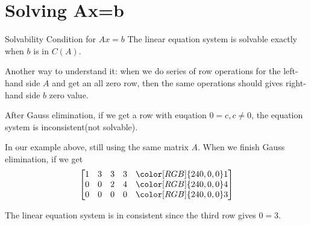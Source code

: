 \documentclass{beamer}
\begin{document}
\section{Solving Ax=b}
\begin{frame}{Solvability Condition for $Ax=b$}
The linear equation system is solvable exactly when $b$ is in $C(A)$.

\vspace{3pt}
Another way to understand it: when we do series of row operations for the left-hand side $A$ and get an all zero row, then the same operations should gives right-hand side $b$ zero value.

\vspace{3pt}
After Gauss elimination, if we get a row with euqation $0=c, c\ne0$, the equation system is \alert{inconsistent}(not solvable).

\vspace{3pt}
In our example above, still using the same matrix $A$. When we finish Gauss elimination, if we get
\begin{equation*}
    \left[ \begin{matrix}
        1&		3&		3&		3&		{\color[RGB]{240, 0, 0} 1}\\
        0&		0&		2&		4&		{\color[RGB]{240, 0, 0} 4}\\
        0&		0&		0&		0&		{\color[RGB]{240, 0, 0} 3}\\
    \end{matrix} \right]
\end{equation*}

The linear equation system is in consistent since the third row gives $0=3$.
\end{frame}
\end{document}
